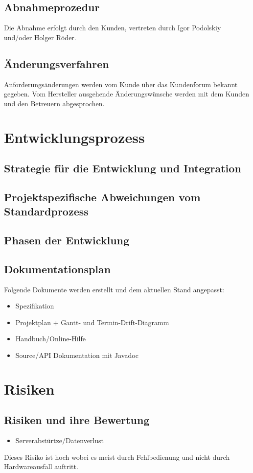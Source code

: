 \documentclass[a4paper,10pt]{scrartcl}
\begin{document}
\subsection{Abnahmeprozedur}
Die Abnahme erfolgt durch den Kunden, vertreten durch Igor Podolskiy und/oder Holger Röder.
\subsection{Änderungsverfahren}
Anforderungsänderungen werden vom Kunde über das Kundenforum bekannt gegeben. Vom Hersteller ausgehende Änderungswünsche werden mit dem
Kunden und den Betreuern abgesprochen.


\section{Entwicklungsprozess}
\subsection{Strategie für die Entwicklung und Integration}
\subsection{Projektspezifische Abweichungen vom Standardprozess}
\subsection{Phasen der Entwicklung}
\subsection{Dokumentationsplan}
Folgende Dokumente werden erstellt und dem aktuellen Stand angepasst:
\begin{itemize}
\item Spezifikation
\item Projektplan + Gantt- und Termin-Drift-Diagramm
\item Handbuch/Online-Hilfe
\item Source/API Dokumentation mit Javadoc
\end{itemize}

\section{Risiken}
\subsection{Risiken und ihre Bewertung}
\begin{itemize}
\item Serverabstürtze/Datenverlust
\end{itemize}
Dieses Risiko ist hoch wobei es meist durch Fehlbedienung und nicht durch Hardwareausfall auftritt.
\end{document}
